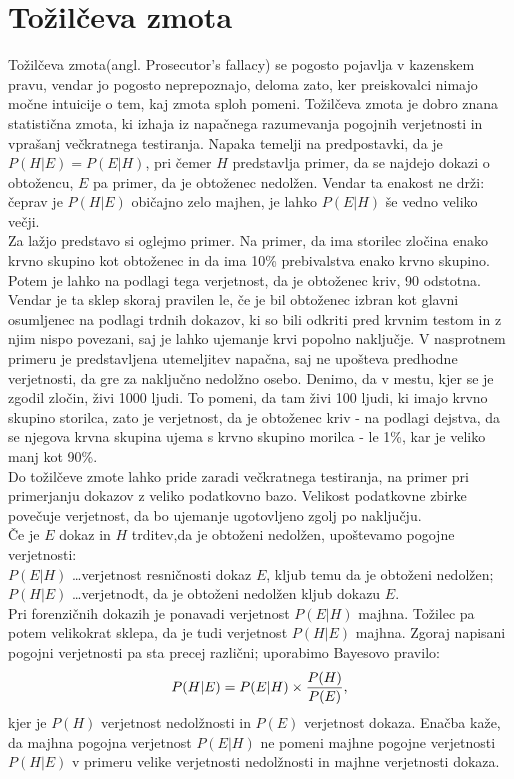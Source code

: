 \documentclass[12pt,a4paper]{amsart}
\theoremstyle{definition} %
\theoremstyle{plain} %
\begin{document}
\section{Tožilčeva zmota}
Tožilčeva zmota(angl. Prosecutor’s fallacy) se pogosto pojavlja v kazenskem pravu, vendar jo pogosto neprepoznajo, deloma zato, ker preiskovalci 
nimajo močne intuicije o tem, kaj zmota sploh pomeni. Tožilčeva zmota je dobro znana statistična zmota, ki izhaja iz napačnega razumevanja 
pogojnih verjetnosti in vprašanj večkratnega testiranja. Napaka temelji na predpostavki, da je $P(H \lvert E) = P(E \lvert H)$, pri čemer $H$ 
predstavlja primer, da se najdejo dokazi o obtožencu, $E$ pa primer, da je obtoženec nedolžen. Vendar ta enakost ne drži: čeprav je $P(H \lvert E)$ 
običajno zelo majhen, je lahko $P(E \lvert H)$ še vedno veliko večji. \\

Za lažjo predstavo si oglejmo primer. Na primer, da ima storilec zločina enako krvno skupino kot obtoženec in da ima 10\% prebivalstva 
enako krvno skupino. Potem je lahko na podlagi tega verjetnost, da je obtoženec kriv, 90 odstotna. Vendar je ta sklep skoraj pravilen le, če 
je bil obtoženec izbran kot glavni osumljenec na podlagi trdnih dokazov, ki so bili odkriti pred krvnim testom in z njim nispo povezani, saj 
je lahko ujemanje krvi popolno naključje. V nasprotnem primeru je predstavljena utemeljitev napačna, saj ne upošteva predhodne verjetnosti, da 
gre za naključno nedolžno osebo. Denimo, da v mestu, kjer se je zgodil zločin, živi 1000 ljudi. To pomeni, da tam živi 100 ljudi, ki imajo 
krvno skupino storilca, zato je verjetnost, da je obtoženec kriv - na podlagi dejstva, da se njegova krvna skupina ujema s krvno skupino 
morilca - le 1\%, kar je veliko manj kot 90\%. \\

Do tožilčeve zmote lahko pride zaradi večkratnega testiranja, na primer pri primerjanju dokazov z veliko podatkovno bazo. Velikost podatkovne 
zbirke povečuje verjetnost, da bo ujemanje ugotovljeno zgolj po naključju. \\

Če je $E$ dokaz in $H$ trditev,da je obtoženi nedolžen, upoštevamo pogojne verjetnosti: \\
$P(E \lvert H)$ \dots verjetnost resničnosti dokaz $E$, kljub temu da je obtoženi nedolžen; \\
$P(H \lvert E)$ \dots verjetnodt, da je obtoženi nedolžen kljub dokazu $E$. \\
Pri forenzičnih dokazih je ponavadi verjetnost $P(E \lvert H)$ majhna. Tožilec pa potem velikokrat sklepa, da je tudi verjetnost 
$P(H \lvert E)$ majhna.
Zgoraj napisani pogojni verjetnosti pa sta precej različni; uporabimo Bayesovo pravilo: \vspace{3mm}
\[P(H \lvert E) = P(E \lvert H) \times \frac{P(H)}{P(E)}, \vspace{3mm}\]
kjer je $P(H)$ verjetnost nedolžnosti in $P(E)$ verjetnost dokaza. Enačba kaže, da majhna pogojna verjetnost $P(E \lvert H)$ ne pomeni majhne 
pogojne verjetnosti $P(H \lvert E)$ v primeru velike verjetnosti nedolžnosti in majhne verjetnosti dokaza. \\
\end{document}
